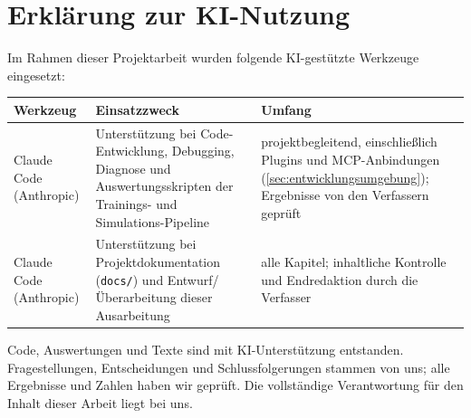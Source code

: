 \chapter*{Erklärung zur KI-Nutzung}
\label{anh:ki-nutzung}

Im Rahmen dieser Projektarbeit wurden folgende KI-gestützte Werkzeuge eingesetzt:

\begin{table}[H]
  \centering
  \begin{tabular}{l>{\raggedright\arraybackslash}p{5cm}>{\raggedright\arraybackslash}p{5cm}}
    \toprule
    \textbf{Werkzeug}  & \textbf{Einsatzzweck} & \textbf{Umfang} \\
    \midrule
    Claude Code (Anthropic) & Unterstützung bei Code-Entwicklung, Debugging,
      Diagnose und Auswertungsskripten der Trainings- und Simulations-Pipeline &
      projektbegleitend, einschließlich Plugins und MCP-Anbindungen
      (\cref{sec:entwicklungsumgebung}); Ergebnisse von den Verfassern
      geprüft \\
    Claude Code (Anthropic) & Unterstützung bei Projektdokumentation
      (\texttt{docs/}) und Entwurf/Über\-arbeitung dieser Ausarbeitung &
      alle Kapitel; inhaltliche Kontrolle und Endredaktion durch die
      Verfasser \\
    \bottomrule
  \end{tabular}
\end{table}

\noindent
Code, Auswertungen und Texte sind mit KI-Unterstützung entstanden. Fragestellungen,
Entscheidungen und Schlussfolgerungen stammen von uns; alle Ergebnisse und Zahlen haben wir
geprüft. Die vollständige Verantwortung für den Inhalt dieser Arbeit liegt bei uns.
